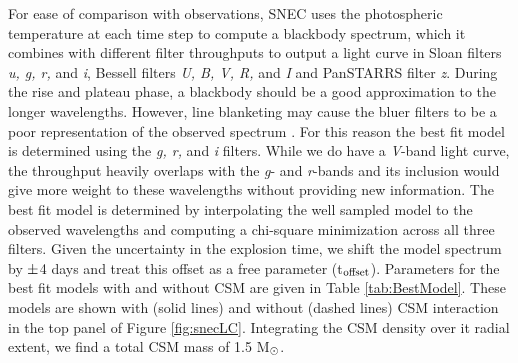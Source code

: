 \documentclass[a4paper,fleqn,usenatbib]{mnras}
\newcommand{\msunperiod}{M$\rm{_{\odot}}$}
\begin{document}
For ease of comparison with observations, SNEC uses the photospheric temperature at each time step to compute a blackbody spectrum, which it combines with different filter throughputs to output a light curve in Sloan filters {\it u, g, r,} and {\it i}, Bessell filters {\it U, B, V, R,} and {\it I} and PanSTARRS filter {\it z}. 
During the rise and plateau phase, a blackbody should be a good approximation to the longer wavelengths. 
However, line blanketing may cause the bluer filters to be a poor representation of the observed spectrum \citep{2009kasen,2005dessart}.
For this reason the best fit model is determined using the {\it g, r,} and {\it i} filters. 
While we do have a {\it V}-band light curve, the throughput heavily overlaps with the {\it g}- and {\it r}-bands and its inclusion would give more weight to these wavelengths without providing new information.
The best fit model is determined by interpolating the well sampled model to the observed wavelengths and computing a chi-square minimization across all three filters.
Given the uncertainty in the explosion time, we shift the model spectrum by $\rm{\pm}$4 days and treat this offset as a free parameter (t$\rm{_{offset}}$).
Parameters for the best fit models with and without CSM are given in Table \ref{tab:BestModel}. 
These models are shown with (solid lines) and without (dashed lines) CSM interaction in the top panel of Figure \ref{fig:snecLC}. 
Integrating the CSM density over it radial extent, we find a total CSM mass of 1.5 \msunperiod. 
\end{document}
